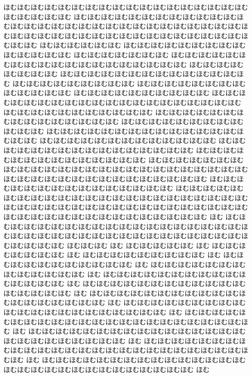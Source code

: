 \documentclass[a4paper]{article}
\begin{document}
\begin{prochomuhomu}{\NabeAzz}
ほむほむほむほむほむほむほむほむほむほむほむほむほむほむほむほむほむほむ ほむほむほむほむほむ ほむほむほむほむほむほむほむほむほむほむほむほむほむほむほむほむほむほむほむほむほむほむほむほむほむほむほむほむほむほむほむほむほむほむほむほむほむほむほむほむほむほむほむほむほむほむほむほむほむほむほむ ほむほむほむほむほむほむ ほむほむほむほむほむほむほむほむほむほむほむほむほむほむ ほむほむほむほむほむほむほむ ほむほむほむほむほむほむほむほむほむほむほむほむほむほむほむほむほむほむほむ ほむほむほむほむほむほむほむほむ ほむほむほむほむほむほむほむほむほむほむほむほむほむほむ ほむほむほむほむほむほむほむほむほむ ほむほむほむほむほむほむほむほむほむほむほむほむほむ ほむほむほむほむほむほむほむほむほむほむ ほむほむほむほむほむほむほむほむほむほむほむほむほむほむほむほむほむほむほむほむ ほむほむほむほむほむほむほむほむほむほむほむ ほむほむほむほむほむほむほむほむほむほむほむほむほむほむほむ ほむほむほむほむほむほむほむほむほむほむほむほむ ほむほむほむほむほむほむほむほむほむほむほむほむほむほむほむほむほむ ほむほむほむほむほむほむほむほむほむほむほむほむほむ ほむほむほむほむほむほむほむほむほむほむほむほむほむほむほむほむ ほむほむほむほむほむほむほむほむほむほむほむほむほむほむ ほむほむほむほむほむほむほむほむほむほむほむほむほむほむほむほむほむほむほむほむほむほむほむほむほむほむほむほむほむほむほむほむほむほむほむほむほむほむほむほむ ほむほむほむほむほむほむほむほむほむほむほむほむほむほむほむ ほむほむほむほむほむほむほむほむほむほむほむほむほむほむほむほむほむほむほむほむほむほむほむほむほむほむほむほむほむほむほむほむほむほむほむほむほむほむほむほむほむほむほむほむほむほむほむほむほむほむほむほむほむほむほむほむ ほむ ほむほむほむほむほむほむほむほむほむほむほむほむほむほむほむほむほむほむほむほむほむほむほむほむほむほむほむほむほむほむほむほむほむほむほむほむほむほむほむほむほむほむ ほむほむほむ ほむ ほむほむほむほむほむ ほむ ほむほむほむほむほむほむほむ ほむ ほむほむほむほむほむほむほむほむほむ ほむ ほむほむほむほむほむほむほむほむほむほむほむ ほむ ほむほむほむほむほむほむほむほむほむほむほむほむほむ ほむ ほむほむほむほむほむほむほむほむほむほむほむほむほむほむほむ ほむ ほむほむほむほむほむほむほむほむほむほむほむほむほむほむほむほむほむ ほむ ほむほむほむほむほむほむほむほむほむほむほむほむほむほむほむほむほむほむほむ ほむ ほむほむほむほむほむほむほむほむほむほむほむほむほむほむほむほむほむほむほむほむほむ ほむ ほむほむほむほむほむほむほむほむほむほむほむほむほむほむほむほむほむほむほむほむほむほむほむ ほむ ほむほむほむほむほむほむほむほむほむほむほむほむほむほむほむほむほむほむほむほむほむほむほむほむほむ ほむ ほむほむほむほむほむほむほむほむほむほむほむほむほむほむほむほむほむほむほむほむほむほむほむほむほむほむほむ ほむ ほむほむほむほむほむほむほむほむほむほむほむほむほむほむほむほむほむほむほむほむほむほむほむほむほむほむほむほむほむ ほむ

\end{prochomuhomu}
\end{document}
